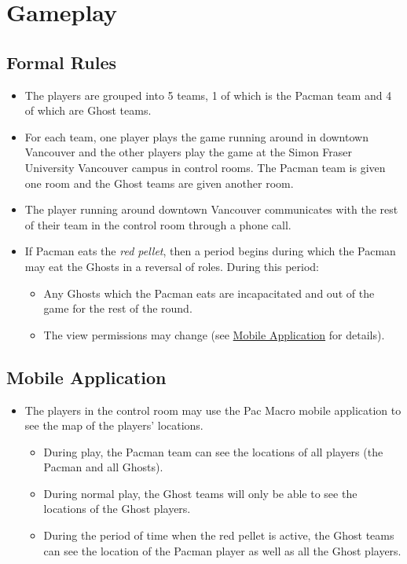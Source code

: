 \documentclass[10pt, oneside, letterpaper, titlepage]{article}
\begin{document}
	\section{Gameplay}
	\label{sec:gameplay}

	\subsection{Formal Rules}
	\label{subsec:gameplay:formal-rules}

	\begin{itemize}
		\item The players are grouped into 5 teams, 1 of which is the Pacman team and 4 of which are Ghost teams.
		\item For each team, one player plays the game running around in downtown Vancouver and the other players play the game at the Simon Fraser University Vancouver campus in control rooms. The Pacman team is given one room and the Ghost teams are given another room.
		\item The player running around downtown Vancouver communicates with the rest of their team in the control room through a phone call.
		\item If Pacman eats the \emph{red pellet}, then a period begins during which the Pacman may eat the Ghosts in a reversal of roles. During this period:
		\begin{itemize}
			\item Any Ghosts which the Pacman eats are incapacitated and out of the game for the rest of the round.
			\item The view permissions may change (see \hyperref[subsec:gameplay:mobile-application]{Mobile Application} for details).
		\end{itemize}
	\end{itemize}

	\subsection{Mobile Application}
	\label{subsec:gameplay:mobile-application}

	\begin{itemize}
		\item The players in the control room may use the Pac Macro mobile application to see the map of the players' locations.
		\begin{itemize}
			\item During play, the Pacman team can see the locations of all players (the Pacman and all Ghosts).
			\item During normal play, the Ghost teams will only be able to see the locations of the Ghost players.
			\item During the period of time when the red pellet is active, the Ghost teams can see the location of the Pacman player as well as all the Ghost players.
		\end{itemize}
	\end{itemize}
\end{document}
